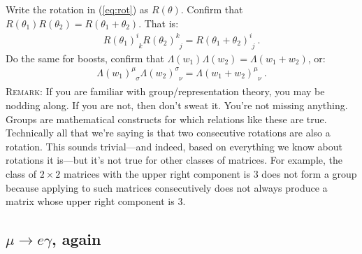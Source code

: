 \documentclass[12pt]{article}
\begin{document}
Write the rotation in (\ref{eq:rot}) as $R(\theta)$. Confirm that $R(\theta_1)R(\theta_2) = R(\theta_1+\theta_2)$. That is:
\begin{align}
	R(\theta_1)^i_{\phantom i k}
	R(\theta_2)^k_{\phantom k j} 
	= R(\theta_1+\theta_2)^i_{\phantom i j} \ .
\end{align}
Do the same for boosts, confirm that $\Lambda(w_1)\Lambda(w_2) = \Lambda(w_1+w_2)$, or:
\begin{align}
	\Lambda(w_1)^\mu_{\phantom \mu \sigma}
	\Lambda(w_2)^\sigma_{\phantom \sigma \nu} 
	= \Lambda(w_1+w_2)^\mu_{\phantom \mu \nu} \ .
\end{align}
\textsc{Remark}: If you are familiar with group/representation theory, you may be nodding along. If you are not, then don't sweat it. You're not missing anything. Groups are mathematical constructs for which relations like these are true. Technically all that we're saying is that two consecutive rotations are also a rotation. This sounds trivial---and indeed, based on everything we know about rotations it is---but it's not true for other classes of matrices. For example, the class of $2\times 2$ matrices with the upper right component is $3$ does not form a group because applying to such matrices consecutively does not always produce a matrix whose upper right component is $3$.





\subsection{$\mu \to e \gamma$, again}
\end{document}
